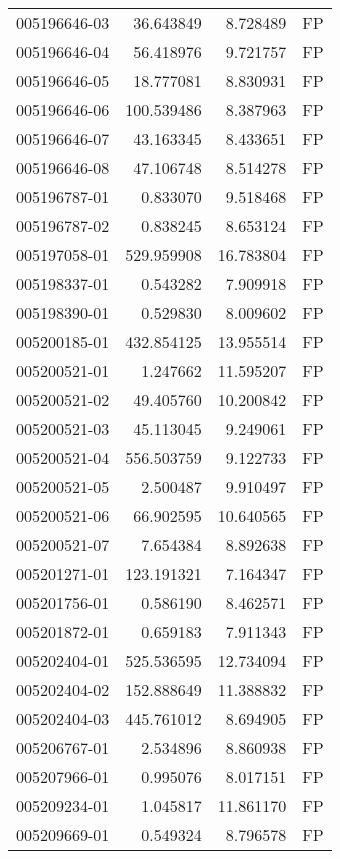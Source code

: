 \begin{tabular}{lrrl}
005196646-03 &   36.643849 &     8.728489 &   FP \\
005196646-04 &   56.418976 &     9.721757 &   FP \\
005196646-05 &   18.777081 &     8.830931 &   FP \\
005196646-06 &  100.539486 &     8.387963 &   FP \\
005196646-07 &   43.163345 &     8.433651 &   FP \\
005196646-08 &   47.106748 &     8.514278 &   FP \\
005196787-01 &    0.833070 &     9.518468 &   FP \\
005196787-02 &    0.838245 &     8.653124 &   FP \\
005197058-01 &  529.959908 &    16.783804 &   FP \\
005198337-01 &    0.543282 &     7.909918 &   FP \\
005198390-01 &    0.529830 &     8.009602 &   FP \\
005200185-01 &  432.854125 &    13.955514 &   FP \\
005200521-01 &    1.247662 &    11.595207 &   FP \\
005200521-02 &   49.405760 &    10.200842 &   FP \\
005200521-03 &   45.113045 &     9.249061 &   FP \\
005200521-04 &  556.503759 &     9.122733 &   FP \\
005200521-05 &    2.500487 &     9.910497 &   FP \\
005200521-06 &   66.902595 &    10.640565 &   FP \\
005200521-07 &    7.654384 &     8.892638 &   FP \\
005201271-01 &  123.191321 &     7.164347 &   FP \\
005201756-01 &    0.586190 &     8.462571 &   FP \\
005201872-01 &    0.659183 &     7.911343 &   FP \\
005202404-01 &  525.536595 &    12.734094 &   FP \\
005202404-02 &  152.888649 &    11.388832 &   FP \\
005202404-03 &  445.761012 &     8.694905 &   FP \\
005206767-01 &    2.534896 &     8.860938 &   FP \\
005207966-01 &    0.995076 &     8.017151 &   FP \\
005209234-01 &    1.045817 &    11.861170 &   FP \\
005209669-01 &    0.549324 &     8.796578 &   FP \\

\end{tabular}
